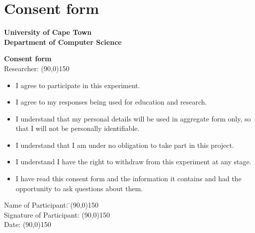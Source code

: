 \section{Consent form}
\label{sec:consent}
\begin{center}
{\LARGE \bf University of Cape Town} \vspace{10pt} \\ 
{\large \bf Department of Computer Science}
\end{center}
{\bf Consent form} \vspace{15pt} \\
Researcher: \line(90,0){150}

\begin{itemize}
\item I agree to participate in this experiment.
\item I agree to my responses being used for education and research.
\item I understand that my personal details will be used in aggregate form only, so that I will not be personally identifiable.
\item I understand that I am under no obligation to take part in this project.
\item I understand I have the right to withdraw from this experiment at any stage.
\item I have read this consent form and the information it contains and had the opportunity to ask questions about them.
\end{itemize}
\begin{tabbing}
Name of Participant: \indent \= \line(90,0){150}     \vspace{15pt} \\
Signature of Participant:  \> \line(90,0){150}  \vspace{15pt} \\
Date: \>  \line(90,0){150}        \vspace{10pt}       \\
\end{tabbing}

